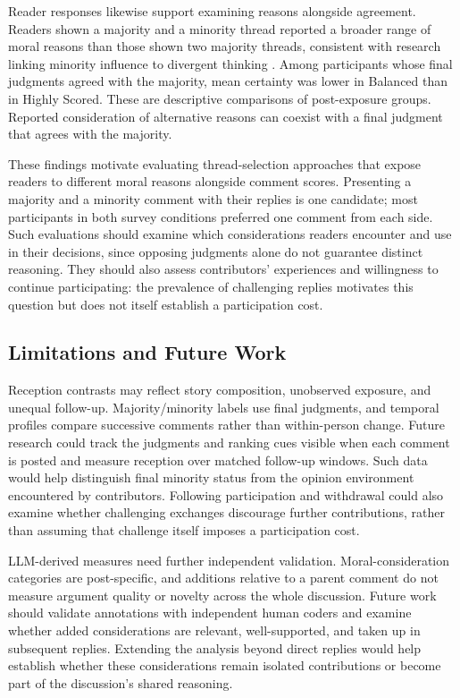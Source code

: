 Reader responses likewise support examining reasons alongside agreement.
Readers shown a majority and a minority thread reported a broader range
of moral reasons than those shown two majority threads, consistent
with research linking minority influence to divergent thinking
\cite{nemeth1987divergent}. Among participants whose final judgments
agreed with the majority, mean certainty was lower in Balanced than in
Highly Scored. These are descriptive comparisons of post-exposure groups.
Reported consideration of alternative reasons can coexist with a final
judgment that agrees with the majority.

These findings motivate evaluating thread-selection approaches that expose
readers to different moral reasons alongside comment scores. Presenting
a majority and a minority comment with their replies is one candidate;
most participants in both survey conditions preferred one comment from
each side. Such evaluations should examine which considerations readers
encounter and use in their decisions, since opposing judgments alone do not
guarantee distinct reasoning. They should also assess contributors'
experiences and willingness to continue participating: the prevalence of
challenging replies motivates this question but does not itself establish
a participation cost.

\subsection{Limitations and Future Work}
\label{subsec:discussion-limitations}

Reception contrasts may reflect story composition, unobserved exposure,
and unequal follow-up. Majority/minority labels use final judgments, and
temporal profiles compare successive comments rather than within-person
change. Future research could track the judgments and ranking cues visible
when each comment is posted and measure reception over matched follow-up
windows. Such data would help distinguish final minority status from the
opinion environment encountered by contributors. Following participation
and withdrawal could also examine whether challenging exchanges discourage
further contributions, rather than assuming that challenge itself imposes
a participation cost.

LLM-derived measures need further independent validation.
Moral-consideration categories are post-specific, and additions relative
to a parent comment do not measure argument quality or novelty across the
whole discussion. Future work should validate annotations with independent
human coders and examine whether added considerations are relevant,
well-supported, and taken up in subsequent replies. Extending the analysis
beyond direct replies would help establish whether these considerations
remain isolated contributions or become part of the discussion's shared
reasoning.

